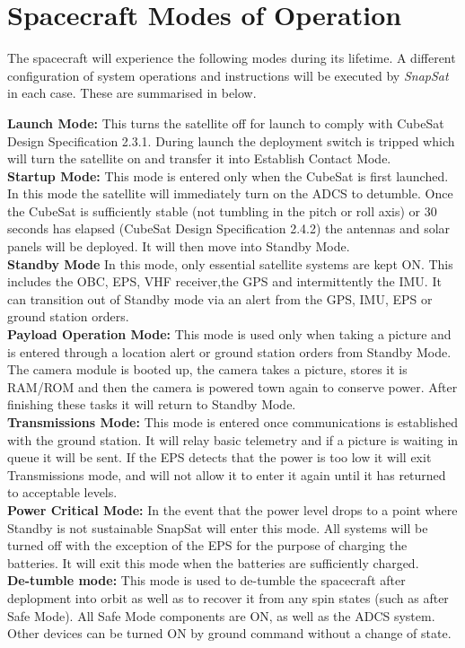 \section{Spacecraft Modes of Operation}
The spacecraft will experience the following modes during its lifetime. A different configuration of system operations and instructions will be executed by \textit{SnapSat} in each case. These are summarised in below.

\noindent
\textbf{Launch Mode: } This turns the satellite off for launch to comply with CubeSat Design Specification 2.3.1. During launch the deployment switch is tripped which will turn the satellite on and transfer it into Establish Contact Mode. \\
\noindent
\textbf{Startup Mode: }This mode is entered only when the CubeSat is first launched.  In this mode the satellite will immediately turn on the ADCS to detumble.  Once the CubeSat is sufficiently stable (not tumbling in the pitch or roll axis) or 30 seconds has elapsed (CubeSat Design Specification 2.4.2) the antennas and solar panels will be deployed. It will then move into Standby Mode. \\
\noindent
\textbf{Standby Mode }In this mode, only essential satellite systems are kept ON.  This includes the OBC, EPS, VHF receiver,the GPS and intermittently the IMU.  It can transition out of Standby mode via an alert from the GPS, IMU, EPS or ground station orders.  \\
\noindent
\textbf{Payload Operation Mode: } This mode is used only when taking a picture and is entered through a location alert or ground station orders from Standby Mode.  The camera module is booted up, the camera takes a picture, stores it is RAM/ROM and then the camera is powered town again to conserve power.  After finishing these tasks it will return to Standby Mode. \\
\noindent
\textbf{Transmissions Mode: } This mode is entered once communications is established with the ground station.  It will relay basic telemetry and if a picture is waiting in queue it will be sent.  If the EPS detects that the power is too low it will exit Transmissions mode, and will not allow it to enter it again until it has returned to acceptable levels.\\
\noindent
\textbf{Power Critical Mode: } In the event that the power level drops to a point where Standby is not sustainable SnapSat will enter this mode.  All systems will be turned off with the exception of the EPS for the purpose of charging the batteries.  It will exit this mode when the batteries are sufficiently charged. \\
\noindent
\textbf{De-tumble mode: } This mode is used to de-tumble the spacecraft after deplopment into orbit as well as to recover it from any spin states (such as after Safe Mode). All Safe Mode components are ON, as well as the ADCS system. Other devices can be turned ON by ground command without a change of state. \\

